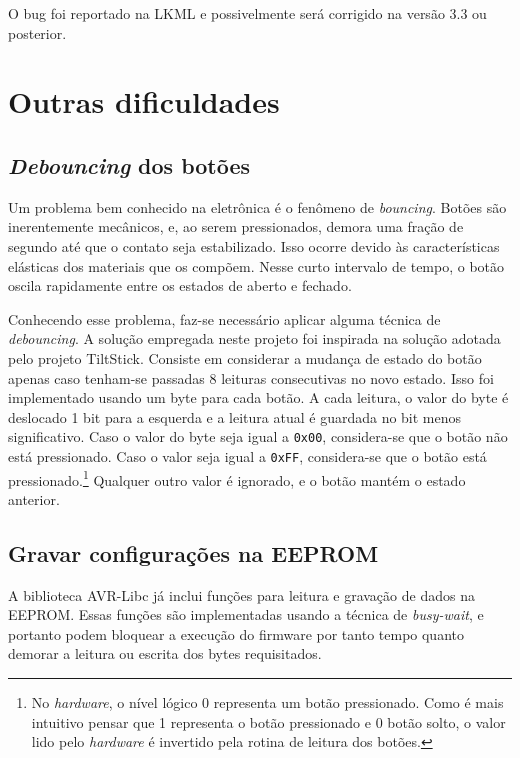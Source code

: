 \documentclass[brazil,pagestart=firstchapter]{abnt}
\begin{document}
O bug foi reportado na \ac{LKML} \cite{LKMLhidnullvalues} e possivelmente
será corrigido na versão 3.3 ou posterior. \cite{LKMLhidnullvaluesResposta}


\section{Outras dificuldades}
\label{sec:outras_dificuldades}


\subsection{\textit{Debouncing} dos botões}
\label{sub:debouncing}

Um problema bem conhecido na eletrônica é o fenômeno de \textit{bouncing}.
Botões são inerentemente mecânicos, e, ao serem pressionados, demora uma
fração de segundo até que o contato seja estabilizado. Isso ocorre devido às
características elásticas dos materiais que os compõem. Nesse curto
intervalo de tempo, o botão oscila rapidamente entre os estados de aberto e
fechado.

Conhecendo esse problema, faz-se necessário aplicar alguma técnica de
\textit{debouncing}. A solução empregada neste projeto foi inspirada na
solução adotada pelo projeto TiltStick. \cite{TiltStick} Consiste em
considerar a mudança de estado do botão apenas caso tenham-se passadas 8
leituras consecutivas no novo estado. Isso foi implementado usando um byte
para cada botão. A cada leitura, o valor do byte é deslocado 1 bit para a
esquerda e a leitura atual é guardada no bit menos significativo. Caso o
valor do byte seja igual a \texttt{0x00}, considera-se que o botão não está
pressionado. Caso o valor seja igual a \texttt{0xFF}, considera-se que o
botão está pressionado.\footnote{
	No \textit{hardware}, o nível lógico 0 representa um botão pressionado.
	Como é mais intuitivo pensar que 1 representa o botão pressionado e 0
	botão solto, o valor lido pelo \textit{hardware} é invertido pela rotina
	de leitura dos botões.
} Qualquer outro valor é ignorado, e o botão mantém o estado anterior.


\subsection{Gravar configurações na EEPROM}
\label{sub:eeprom}

A biblioteca AVR-Libc já inclui funções para leitura e gravação de dados na
\ac{EEPROM}. Essas funções são implementadas usando a técnica de
\textit{busy-wait}, e portanto podem bloquear a execução do firmware por
tanto tempo quanto demorar a leitura ou escrita dos bytes requisitados.
\cite{avrlibceeprom}
\end{document}
